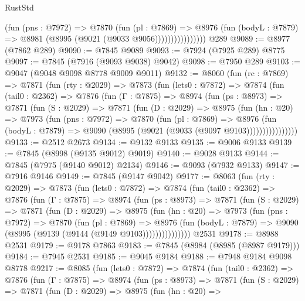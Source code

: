 \begin{lexlean}{RustStd}
\begin{coremodule}
                        (fun (pns : @7972) =>
                        @7870
                          (fun (pl : @7869) =>
                          @8976
                            (fun (bodyL : @7879) => @8981 (@8995 (@9021 (@9033 @9056))))))))))))))))
    @289
@9089 := @8977 (@7862 @289)
@9090 := @7845 @9089
@9093 := @7924 (@7925 @289) @8775
@9097 := @7845 (@7916 (@9093 @9038) @9042)
@9098 := @7950 @289
@9103 := @9047 (@9048 @9098 @8778 @9009 @9011)
@9132 := @8060
    (fun (rc : @7869) =>
    @7871
      (fun (rty : @2029) =>
      @7873
        (fun (lets0 : @7872) =>
        @7874
          (fun (tail0 : @2362) =>
          @7876
            (fun (Γ : @7875) =>
            @8974
              (fun (ps : @8973) =>
              @7871
                (fun (S : @2029) =>
                @7871
                  (fun (D : @2029) =>
                  @8975
                    (fun (hn : @20) =>
                    @7973
                      (fun (pns : @7972) =>
                      @7870
                        (fun (pl : @7869) =>
                        @8976
                          (fun (bodyL : @7879) =>
                          @9090 (@8995 (@9021 (@9033 (@9097 @9103))))))))))))))))
@9133 := @2512 @2673
@9134 := @9132 @9133
@9135 := @9006 @9133
@9139 := @7845 (@8998 (@9135 @9012) @9019)
@9140 := @9028 @9133
@9144 := @7845 (@7975 (@9140 @9012) @2134)
@9146 := @9093 (@7932 @9133)
@9147 := @7916 @9146
@9149 := @7845 (@9147 @9042)
@9177 := @8063
    (fun (rty : @2029) =>
    @7873
      (fun (lets0 : @7872) =>
      @7874
        (fun (tail0 : @2362) =>
        @7876
          (fun (Γ : @7875) =>
          @8974
            (fun (ps : @8973) =>
            @7871
              (fun (S : @2029) =>
              @7871
                (fun (D : @2029) =>
                @8975
                  (fun (hn : @20) =>
                  @7973
                    (fun (pns : @7972) =>
                    @7870
                      (fun (pl : @7869) =>
                      @8976
                        (fun (bodyL : @7879) =>
                        @9090 (@8995 (@9139 (@9144 (@9149 @9103)))))))))))))))
    @2531
@9178 := @8988 @2531
@9179 := @9178 @7863
@9183 := @7845 (@8984 (@8985 (@8987 @9179)))
@9184 := @7945 @2531
@9185 := @9045 @9184
@9188 := @7948 @9184 @9098 @8778
@9217 := @8085
    (fun (lets0 : @7872) =>
    @7874
      (fun (tail0 : @2362) =>
      @7876
        (fun (Γ : @7875) =>
        @8974
          (fun (ps : @8973) =>
          @7871
            (fun (S : @2029) =>
            @7871
              (fun (D : @2029) =>
              @8975
                (fun (hn : @20) =>

\end{coremodule}
\end{lexlean}
